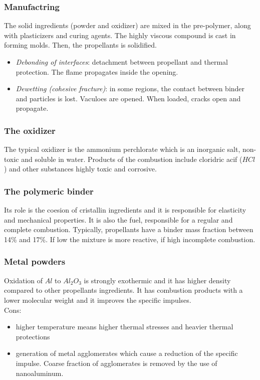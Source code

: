\documentclass[12pt]{article}
\begin{document}
\subsubsection{Manufactring}

The solid ingredients (powder and oxidizer) are mixed in the pre-polymer, along with plasticizers and curing agents. The highly viscous compound is cast in forming molds. Then, the propellants is solidified.
\begin{itemize}
    \item \textit{Debonding of interfaces}: detachment between propellant and thermal protection. The flame propagates inside the opening.
    \item \textit{Dewetting (cohesive fracture)}: in some regions, the contact between binder and particles is lost. Vaculoes are opened. When loaded, cracks open and propagate.
\end{itemize}

\subsubsection{The oxidizer}

The typical oxidizer is the ammonium perchlorate which is an inorganic salt, non-toxic and soluble in water. Products of the combustion include cloridric acif ($HCl$) and other substances highly toxic and corrosive.

\subsubsection{The polymeric binder}

Its role is the coesion of cristallin ingredients and it is responsible for elasticity and mechanical properties. It is also the fuel, responsible for a regular and complete combustion. Typically, propellants have a binder mass fraction between 14\% and 17\%. If low the mixture is more reactive, if high incomplete combustion.

\subsubsection{Metal powders}

Oxidation of $Al$ to $Al_{2}O_{3}$ is strongly exothermic and it has higher density compared to other propellants ingredients. It has combustion products with a lower molecular weight and it improves the specific impulses.\\
Cons:
\begin{itemize}
    \item higher temperature means higher thermal stresses and heavier thermal protections
    \item generation of metal agglomerates which cause a reduction of the specific impulse. Coarse fraction of agglomerates is removed by the use of nanoaluminum.
\end{itemize}
\end{document}
